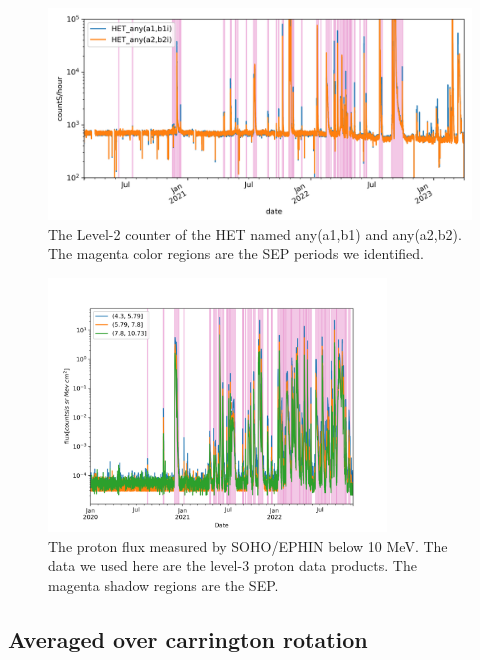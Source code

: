 \begin{figure}
    \centering
    \includegraphics[width = \textwidth]{images/ACR/SOLO-lvl2-trriger.png}
    \caption{The Level-2 counter of the \ac{HET} named any(a1,b1) and any(a2,b2). The magenta color regions are the SEP periods we identified.}
    \label{Fig:solo-lvl2}
\end{figure}



\begin{figure}
    \centering
    \includegraphics[width = 0.8\textwidth]{images/ACR/SOLO-EPHIN-l3i-log2+6-proton-6H.png}
    \caption{The proton flux measured by SOHO/EPHIN below 10 MeV. The data we used here are the level-3 proton data products. The magenta shadow regions are the SEP.}
    \label{Fig:SOHO_EPHIN_Proton_flux}
\end{figure}

\subsection{Averaged over carrington rotation}

